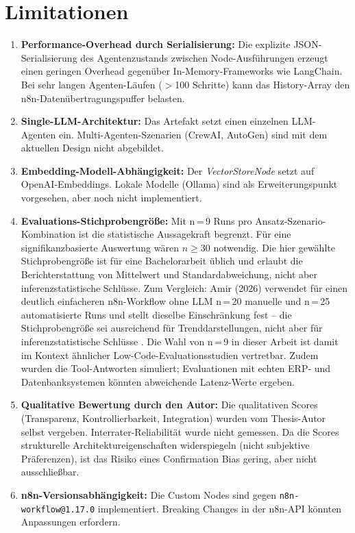 \documentclass[12pt,a4paper,oneside]{report}
\begin{document}
\section{Limitationen}
\label{sec:limitations}

\begin{enumerate}
  \item \textbf{Performance-Overhead durch Serialisierung:} Die explizite JSON-Serialisierung
    des Agentenzustands zwischen Node-Ausführungen erzeugt einen geringen Overhead
    gegenüber In-Memory-Frameworks wie LangChain. Bei sehr langen Agenten-Läufen
    ($>$100 Schritte) kann das History-Array den n8n-Daten\-übertragungspuffer belasten.

  \item \textbf{Single-LLM-Architektur:} Das Artefakt setzt einen einzelnen \ac{LLM}-Agenten
    ein. Multi-Agenten-Szenarien (CrewAI, AutoGen) sind mit dem aktuellen Design
    nicht abgebildet.

  \item \textbf{Embedding-Modell-Abhängigkeit:} Der \textit{VectorStoreNode} setzt
    auf OpenAI-Embeddings. Lokale Modelle (Ollama) sind als Erweiterungspunkt
    vorgesehen, aber noch nicht implementiert.

  \item \textbf{Evaluations-Stichprobengröße:} Mit n\,=\,9 Runs pro Ansatz-Szenario-Kombination
    ist die statistische Aussagekraft begrenzt. Für eine signifikanzbasierte Auswertung
    wären $n \geq 30$ notwendig. Die hier gewählte Stichprobengröße ist für eine
    Bachelorarbeit üblich und erlaubt die Berichterstattung von Mittelwert und
    Standardabweichung, nicht aber inferenzstatistische Schlüsse. Zum Vergleich:
    Amir (2026) verwendet für einen deutlich einfacheren n8n-Workflow ohne LLM
    n\,=\,20 manuelle und n\,=\,25 automatisierte Runs und stellt dieselbe
    Einschränkung fest -- die Stichprobengröße sei ausreichend für
    Trenddarstellungen, nicht aber für inferenzstatistische Schlüsse
    \cite{amir2026evaluating}. Die Wahl von n\,=\,9 in dieser Arbeit ist damit
    im Kontext ähnlicher Low-Code-Evaluationsstudien vertretbar. Zudem wurden die
    Tool-Antworten simuliert; Evaluationen mit echten ERP- und Datenbanksystemen
    könnten abweichende Latenz-Werte ergeben.

  \item \textbf{Qualitative Bewertung durch den Autor:} Die qualitativen Scores
    (Transparenz, Kontrollierbarkeit, Integration) wurden vom Thesis-Autor selbst
    vergeben. Interrater-Reliabilität wurde nicht gemessen. Da die Scores strukturelle
    Architektureigenschaften widerspiegeln (nicht subjektive Präferenzen), ist das
    Risiko eines Confirmation Bias gering, aber nicht ausschließbar.

  \item \textbf{n8n-Versionsabhängigkeit:} Die Custom Nodes sind gegen
    \texttt{n8n-workflow@1.17.0} implementiert. Breaking Changes in der n8n-\ac{API}
    könnten Anpassungen erfordern.
\end{enumerate}
\end{document}
